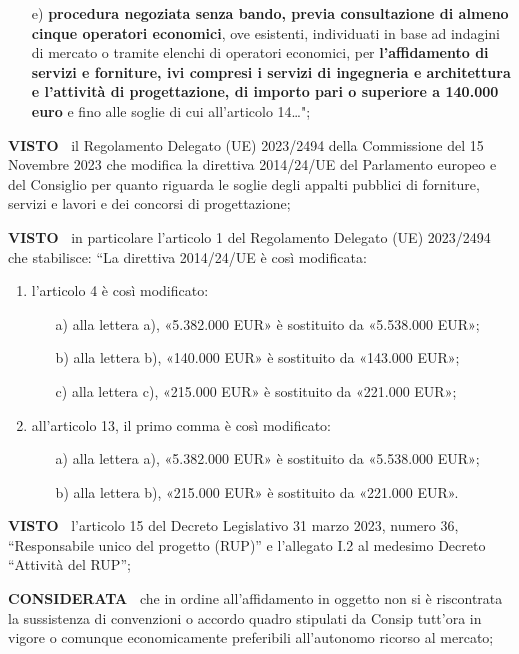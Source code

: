 \documentclass[a4paper,12pt]{letter}
\begin{document}
\begin{enumerate}
\item[e)] \textbf{procedura negoziata senza bando, previa consultazione di almeno
cinque operatori economici}, ove esistenti, individuati in base ad indagini
di mercato o tramite elenchi di operatori economici, per \textbf{l'affidamento di
servizi e forniture, ivi compresi i servizi di ingegneria e architettura
e l'attività di progettazione, di importo pari o superiore a 140.000
euro} e fino alle soglie di cui all'articolo 14…";

\end{enumerate}

\textbf{VISTO~} il Regolamento Delegato (UE)
2023/2494 della Commissione del 15 Novembre 2023 che modifica la direttiva
2014/24/UE del Parlamento europeo e del Consiglio per quanto riguarda
le soglie degli appalti pubblici di forniture, servizi e lavori e dei
concorsi di progettazione;

\textbf{VISTO~}  in particolare l’articolo 1 del Regolamento Delegato (UE)
2023/2494 che stabilisce: ``La direttiva 2014/24/UE è così modificata: 

\begin{enumerate}
\item l’articolo 4 è così modificato: 
\begin{enumerate}
\item[a)]  alla lettera a), «5.382.000 EUR» è sostituito da «5.538.000 EUR»;
\item[b)]  alla lettera b), «140.000 EUR» è sostituito da «143.000 EUR»; 
\item[c)]  alla lettera c), «215.000 EUR» è sostituito da «221.000 EUR»; 
\end{enumerate}

\item all’articolo 13, il primo comma è così modificato: 
\begin{enumerate}
\item[a)]  alla lettera a), «5.382.000 EUR» è sostituito da «5.538.000 EUR»; 
\item[b)]  alla lettera b), «215.000 EUR» è sostituito da «221.000 EUR».
\end{enumerate}
\end{enumerate}

\textbf{VISTO~} l’articolo 15 del Decreto Legislativo 31
marzo 2023, numero 36, ``Responsabile unico del progetto (RUP)'' e
l’allegato I.2 al medesimo Decreto ``Attività del RUP'';

\textbf{CONSIDERATA~} che in ordine all’affidamento in oggetto
non si è riscontrata la sussistenza di convenzioni o accordo quadro
stipulati da Consip tutt’ora in vigore o comunque economicamente
preferibili all’autonomo ricorso al mercato;
\end{document}
